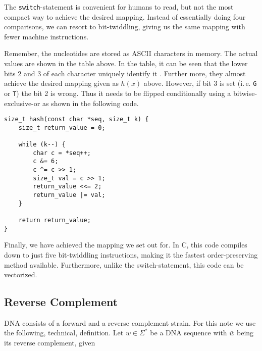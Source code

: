 \documentclass[10pt,letterpaper]{article}
\begin{document}
The \lstinline!switch!-statement is convenient for humans to read, but not the most compact way to achieve the desired mapping. Instead of essentially doing four comparisons, we can resort to bit-twiddling, giving us the same mapping with fewer machine instructions.


Remember, the nucleotides are stored as ASCII characters in memory. The actual values are shown in the table above. In the table, it can be seen that the lower bits 2 and 3 of each character uniquely identify it \cite{up2bit}. Further more, they almost achieve the desired mapping given as $h(x)$ above. However, if bit 3 is set (i.\,e. \texttt{G} or \texttt{T}) the bit 2 is wrong. Thus it needs to be flipped conditionally using a bitwise-exclusive-or as shown in the following code.

\begin{lstlisting}
size_t hash(const char *seq, size_t k) {  
    size_t return_value = 0;

    while (k--) {
    	char c = *seq++;
    	c &= 6;
    	c ^= c >> 1;
    	size_t val = c >> 1;
    	return_value <<= 2;
    	return_value |= val;
    }

    return return_value;
}
\end{lstlisting}

Finally, we have achieved the mapping we set out for. In C, this code compiles down to just five bit-twiddling instructions, making it the fastest order-preserving method available. Furthermore, unlike the switch-statement, this code can be vectorized.


\subsection{Reverse Complement}
\label{sec:revcomp}

DNA consists of a forward and a reverse complement strain. For this note we use the following, technical, definition. Let $w\in \Sigma^*$ be a DNA sequence with $\bar w$ being its reverse complement, given
\end{document}
